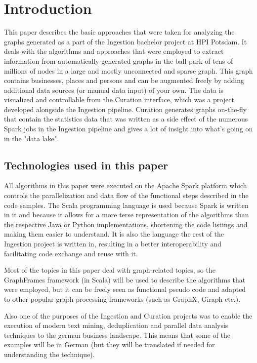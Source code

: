 \documentclass[
        a4paper,     %
        titlepage,   %
        oneside,     %
        parskip      %
]{scrartcl}          %
\begin{document}
  \section{Introduction}
    This paper describes the basic approaches that were taken for analyzing the
    graphs generated as a part of the Ingestion bachelor project at HPI Potsdam.
    It deals with the algorithms and approaches that were employed to extract
    information from automatically generated graphs in the ball park of
    tens of millions of nodes in a large and mostly unconnected and sparse graph.
    This graph contains businesses, places and persons and can be augmented freely by adding
    additional data sources (or manual data input) of your own. The data is visualized and controllable from the
    Curation interface, which was a project developed alongside the Ingestion pipeline.
    Curation generates graphs on-the-fly that contain the statistics data that was written
    as a side effect of the numerous Spark jobs in the Ingestion pipeline and gives
    a lot of insight into what's going on in the "data lake".

    \subsection{Technologies used in this paper}
    All algorithms in this paper were executed on the Apache Spark platform which
    controls the parallelization and data flow of the functional steps described
    in the code samples. The Scala programming language is used because Spark is
    written in it and because it allows for a more terse representation of the
    algorithms than the respective Java or Python implementations, shortening
    the code listings and making them easier to understand. It is also the language
    the rest of the Ingestion project is written in, resulting in a better interoperability
    and facilitating code exchange and reuse with it.

    Most of the topics in this paper deal with graph-related topics, so the GraphFrames framework
    (in Scala) will be used to describe the algorithms that were employed,
    but it can be freely seen as functional pseudo code and adapted to other popular
    graph processing frameworks (such as GraphX, Giraph etc.).

    Also one of the purposes of the Ingestion and Curation projects was to enable
    the execution of modern text mining, deduplication and parallel data analysis techniques
    to the german business landscape. This means that some of the examples will be
    in German (but they will be translated if needed for understanding the technique).
\end{document}
